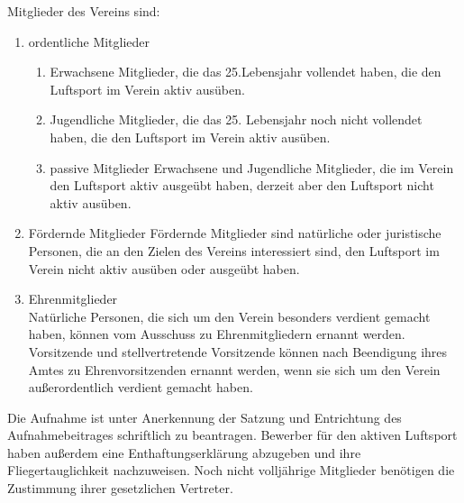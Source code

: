 \documentclass[10pt,a4paper,parskip=half]{scrartcl}
\begin{document}
\begin{contract}
    \label{C:Mitglieder}
    
    Mitglieder des Vereins sind:
    \begin{enumerate}
      \item ordentliche Mitglieder
            \begin{enumerate}
              \item Erwachsene Mitglieder,
                    die das 25.Lebensjahr vollendet haben,
                    die den Luftsport im Verein aktiv
                    ausüben. \label{S:OrdentlicheMitglieder:Erwachsene}
              \item Jugendliche Mitglieder,
                    die das 25. Lebensjahr noch nicht vollendet haben,
                    die den Luftsport im Verein aktiv ausüben. \label{S:OrdentlicheMitglieder:Jugendliche}
              \item{passive Mitglieder} Erwachsene und Jugendliche Mitglieder,
                    die im Verein den Luftsport aktiv ausgeübt haben,
                    derzeit aber den Luftsport nicht aktiv ausüben.
            \end{enumerate}
      \item{Fördernde Mitglieder} Fördernde Mitglieder sind natürliche oder juristische Personen,
            die an den Zielen des Vereins interessiert sind,
            den Luftsport im Verein nicht aktiv ausüben oder ausgeübt haben.
            
      \item{Ehrenmitglieder}\\
            Natürliche Personen,
            die sich um den Verein besonders verdient gemacht haben,
            können vom Ausschuss zu Ehrenmitgliedern ernannt werden.
            Vorsitzende und stellvertretende Vorsitzende können nach Beendigung ihres Amtes zu Ehrenvorsitzenden ernannt werden,
            wenn sie sich um den Verein außerordentlich verdient gemacht haben.
    \end{enumerate}\label{S:OrdentlicheMitglieder}
    
    
    Die Aufnahme ist unter Anerkennung der Satzung und Entrichtung des Aufnahmebeitrages schriftlich zu beantragen.
    Bewerber für den aktiven Luftsport haben außerdem eine Enthaftungserklärung abzugeben und ihre Fliegertauglichkeit nachzuweisen.
    Noch nicht volljährige Mitglieder benötigen die Zustimmung ihrer gesetzlichen Vertreter.
    

\end{contract}
\end{document}
